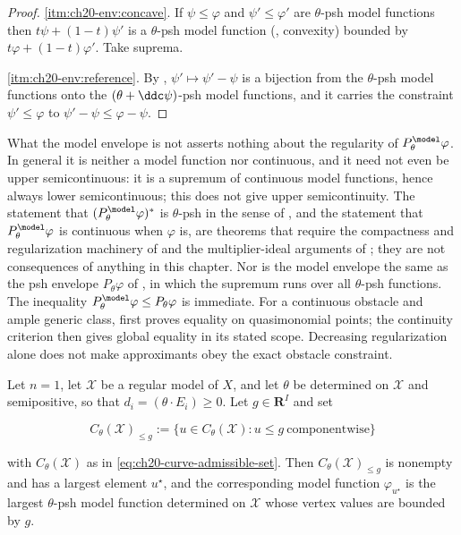 \begin{proof}
\cref{itm:ch20-env:concave}.  If $\psi\leq\varphi$ and
$\psi'\leq\varphi'$ are $\theta$-psh model functions then
$t\psi+(1-t)\psi'$ is a $\theta$-psh model function
(, convexity) bounded by
$t\varphi+(1-t)\varphi'$.  Take suprema.

\cref{itm:ch20-env:reference}.  By ,
$\psi'\mapsto\psi'-\psi$ is a bijection from the $\theta$-psh model
functions onto the $(\theta+\ddc\psi)$-psh model functions, and it carries
the constraint $\psi'\leq\varphi$ to $\psi'-\psi\leq\varphi-\psi$.
\end{proof}

\begin{warning}{What the model envelope is not}
 asserts nothing about the regularity of
$P^{\model}_\theta\varphi$.  In general it is neither a model function nor
continuous, and it need not even be upper semicontinuous: it is a
supremum of continuous model functions, hence always lower
semicontinuous; this does not give upper semicontinuity.  The statement that
$(P^{\model}_\theta\varphi)^*$ is $\theta$-psh in the sense of
, and the statement that
$P^{\model}_\theta\varphi$ is continuous when $\varphi$ is, are theorems
that require the compactness and regularization machinery of
 and the multiplier-ideal arguments of
; they are not consequences of anything in this
chapter.  Nor is the model envelope the same as the psh envelope
$P_\theta\varphi$ of , in which the supremum runs
over all $\theta$-psh functions.  The inequality
$P^{\model}_\theta\varphi\leq P_\theta\varphi$ is immediate.  For a
continuous obstacle and ample generic class,
 first proves equality on
quasimonomial points; the continuity criterion
 then gives global equality in its
stated scope.  Decreasing regularization alone does not make approximants
obey the exact obstacle constraint.
\end{warning}

\begin{proposition}
\label{prop:ch20-curve-envelope}
Let $n=1$, let $\mathcal X$ be a regular model of $X$, and let
$\theta$ be determined on $\mathcal X$ and semipositive, so that
$d_i=(\theta\cdot E_i)\geq0$.  Let $g\in\mathbf R^I$ and set

\[
 C_\theta(\mathcal X)_{\le g}
 :=\{u\in C_\theta(\mathcal X):u\leq g\ \text{componentwise}\}
\]

with $C_\theta(\mathcal X)$ as in
\eqref{eq:ch20-curve-admissible-set}.  Then
$C_\theta(\mathcal X)_{\le g}$ is nonempty and has a largest element
$u^\star$, and the corresponding model function
$\varphi_{u^\star}$ is the largest $\theta$-psh model function
determined on $\mathcal X$ whose vertex values are bounded by $g$.
\end{proposition}

